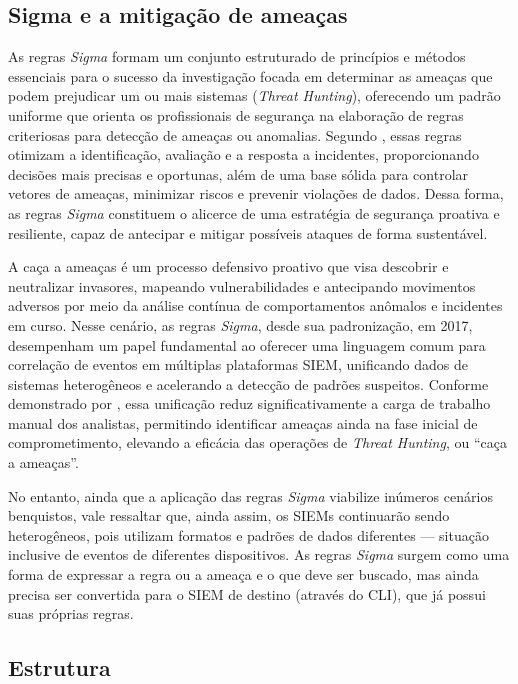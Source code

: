 \subsection{Sigma e a mitigação de ameaças}

As regras \textit{Sigma} formam um conjunto estruturado de princípios e métodos essenciais para o sucesso da investigação focada em determinar as ameaças que podem prejudicar um ou mais sistemas (\textit{Threat Hunting}), 
oferecendo um padrão uniforme que orienta os profissionais de segurança na elaboração de regras criteriosas para detecção de ameaças ou anomalias. 
Segundo , essas regras otimizam a identificação, avaliação e a resposta a incidentes,
proporcionando decisões mais precisas e oportunas, além de uma base sólida para controlar vetores de ameaças, minimizar riscos e prevenir violações de dados.
Dessa forma, as regras \textit{Sigma} constituem o alicerce de uma estratégia de segurança proativa e resiliente, capaz de antecipar e mitigar possíveis ataques de forma sustentável.

A caça a ameaças é um processo defensivo proativo que visa descobrir e neutralizar invasores, mapeando vulnerabilidades e antecipando movimentos adversos por meio da análise contínua de comportamentos anômalos e incidentes em curso.
Nesse cenário, as regras \textit{Sigma}, desde sua padronização, em 2017, desempenham um papel fundamental ao oferecer uma linguagem comum para correlação de eventos em múltiplas plataformas SIEM,
unificando dados de sistemas heterogêneos e acelerando a detecção de padrões suspeitos.
Conforme demonstrado por , essa unificação reduz significativamente a carga de trabalho manual dos analistas, 
permitindo identificar ameaças ainda na fase inicial de comprometimento, elevando a eficácia das operações de \textit{Threat Hunting}, ou ``caça a ameaças''.

No entanto, ainda que a aplicação das regras \textit{Sigma} viabilize inúmeros cenários benquistos, vale ressaltar que, ainda assim, os SIEMs continuarão sendo heterogêneos, pois utilizam formatos e padrões de dados diferentes --- situação inclusive de eventos de diferentes dispositivos. 
As regras \textit{Sigma} surgem como uma forma de expressar a regra ou a ameaça e o que deve ser buscado, mas ainda precisa ser convertida para o SIEM de destino (através do CLI), que já possui suas próprias regras.

\subsection{Estrutura}

